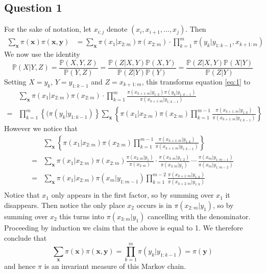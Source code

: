 \documentclass[10pt,a4paper,notitlepage]{article}
\author{Jonah Gibbon}
\newcommand{\p}{\mathbb{P}}
\newcommand{\x}{\mathbf{x}}
\newcommand{\y}{\mathbf{y}}
\begin{document}
\subsection*{\centering Question 1}
For the sake of notation, let $x_{i:j}$ denote $(x_{i},x_{i+1},\hdots,x_{j})$. Then
\begin{equation}
\begin{aligned}\label{eq:1}
\sum_{\x}\pi(\x)\pi(\x,\y) &= \sum_{\x}\pi(x_{1}|x_{2:m})\pi(x_{2:m})\cdot \prod_{k=1}^{m}\pi(y_{k}|y_{1:k-1},x_{k+1:m})
\end{aligned}
\end{equation}
We now use the identity
\begin{equation}\label{eq:2}
\p(X|Y,Z)=\frac{\p(X,Y,Z)}{\p(Y,Z)}=\frac{\p(Z|X,Y)\p(X,Y)}{\p(Z|Y)\p(Y)}=\frac{\p(Z|X,Y)\p(X|Y)}{\p(Z|Y)}
\end{equation}
Setting $X=y_{k}$, $Y=y_{1:k-1}$ and $Z=x_{k+1:m}$, this transforms equation \eqref{eq:1} to
\begin{equation}
\begin{aligned}
&\sum_{\x}\pi(x_{1}|x_{2:m})\pi(x_{2:m})\cdot \prod_{k=1}^{m}\frac{\pi(x_{k+1:m}|y_{1:k})\pi(y_{k}|y_{1:k-1})}{\pi(x_{k+1:m}|y_{1:k-1})}\\
= &\prod_{k=1}^{m}\left\{(\pi(y_{k}|y_{1:k-1})\right\}\sum_{\x}\left\{\pi(x_{1}|x_{2:m})\pi(x_{2:m})\prod_{k=1}^{m-1}\frac{\pi(x_{k+1:m}|y_{1:k})}{\pi(x_{k+1:m}|y_{1:k-1})}\right\}
\end{aligned}
\end{equation}
However we notice that
\begin{equation}
\begin{aligned}
&\sum_{\x}\left\{\pi(x_{1}|x_{2:m})\pi(x_{2:m})\prod_{k=1}^{m-1}\frac{\pi(x_{k+1:m}|y_{1:k})}{\pi(x_{k+1:m}|y_{1:k-1})}\right\}\\ 
= &\sum_{\x}\pi(x_{1}|x_{2:m})\pi(x_{2:m})\frac{\pi(x_{2:m}|y_{1})}{\pi(x_{2:m})}\cdot \frac{\pi(x_{3:m}|y_{1:2})}{\pi(x_{3:m}|y_{1})}\, \cdots\, \frac{\pi(x_{m}|y_{1:m-1})}{\pi(x_{m}|y_{1:m-2})}\\
= &\sum_{\x}\pi(x_{1}|x_{2:m})\pi(x_{m}|y_{1:m-1})\prod_{k=1}^{m-2}\frac{\pi(x_{k+1:m}|y_{1:k})}{\pi(x_{k+2:m}|y_{1:k})}\\
\end{aligned}
\end{equation}
Notice that $x_{1}$ only appears in the first factor, so by summing over $x_{1}$ it disappears. Then notice the only place $x_{2}$ occurs is in $\pi(x_{2:m}|y_{1})$, so by summing over $x_{2}$ this turns into $\pi(x_{3:m}|y_{1})$ cancelling with the denominator. Proceeding by induction we claim that the above is equal to 1. We therefore conclude that
\begin{equation}
\sum_{\x}\pi(\x)\pi(\x,\y)=\prod_{k=1}^{m}\pi(y_{k}|y_{1:k-1})=\pi(\y)
\end{equation}
and hence $\pi$ is an invariant measure of this Markov chain.
\end{document}
